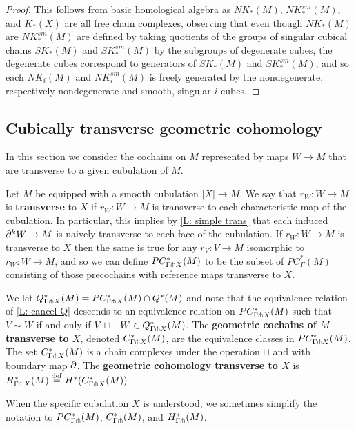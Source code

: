 \begin{proof}
	This follows from basic homological algebra \cite[Theorem 45.5]{Mun84} as $NK_*(M)$, $NK^{sm}_*(M)$, and $K_*(X)$ are all free chain complexes, observing that even though $NK_*(M)$ are $NK^{sm}_*(M)$ are defined by taking quotients of the groups of singular cubical chains $SK_*(M)$ and $SK^{sm}_*(M)$ by the subgroups of degenerate cubes, the degenerate cubes correspond to generators of $SK_*(M)$ and $SK^{sm}_*(M)$, and so each $NK_i(M)$ and $NK^{sm}_i(M)$ is freely generated by the nondegenerate, respectively nondegenerate and smooth, singular $i$-cubes.
\end{proof}

\subsection{Cubically transverse geometric cohomology}\label{S: transverse cochains}

In this section we consider the cochains on $M$ represented by maps $W \to M$ that are transverse to a given cubulation of $M$.

\begin{definition}
	Let $M$ be equipped with a smooth cubulation $|X| \to M$.
	We say that $r_W \colon W \to M$ is \textbf{transverse} to $X$ if $r_W \colon W \to M$ is transverse to each characteristic map of the cubulation.
	In particular, this implies by \cref{L: simple trans} that each induced $\partial^kW \to M$ is naively transverse to each face of the cubulation.
	If $r_W \colon W \to M$ is transverse to $X$ then the same is true for any $r_V \colon V \to M$ isomorphic to $r_W \colon W \to M$, and so we can define $PC^*_{\Gamma \pitchfork X}(M)$ to be the subset of $PC^*_{\Gamma}(M)$ consisting of those precochains with reference maps transverse to $X$.

	We let $Q^*_{\Gamma \pitchfork X}(M) = PC_{\Gamma \pitchfork X}^*(M) \cap Q^*(M)$ and note that the equivalence relation of \cref{L: cancel Q} descends to an equivalence relation on $PC_{\Gamma \pitchfork X}^*(M)$ such that $V\sim W$ if and only if $V \sqcup -W \in Q^*_{\Gamma \pitchfork X}(M)$.
	The \textbf{geometric cochains of $M$ transverse to $X$}, denoted $C_{\Gamma \pitchfork X}^*(M)$, are the equivalence classes in $PC_{\Gamma \pitchfork X}^*(M)$.
	The set $C_{\Gamma \pitchfork X}^*(M)$ is a chain complexes under the operation $\sqcup$ and with boundary map $\partial$.
	The \textbf{geometric cohomology transverse to $X$} is $H_{\Gamma \pitchfork X}^*(M) \stackrel{\mathrm{def}}{=} H^*(C_{\Gamma \pitchfork X}^*(M))$.

	When the specific cubulation $X$ is understood, we sometimes simplify the notation to $PC_{\Gamma\pitchfork}^*(M)$, $C_{\Gamma\pitchfork}^*(M)$, and $H_{\Gamma\pitchfork}^*(M)$.
\end{definition}

